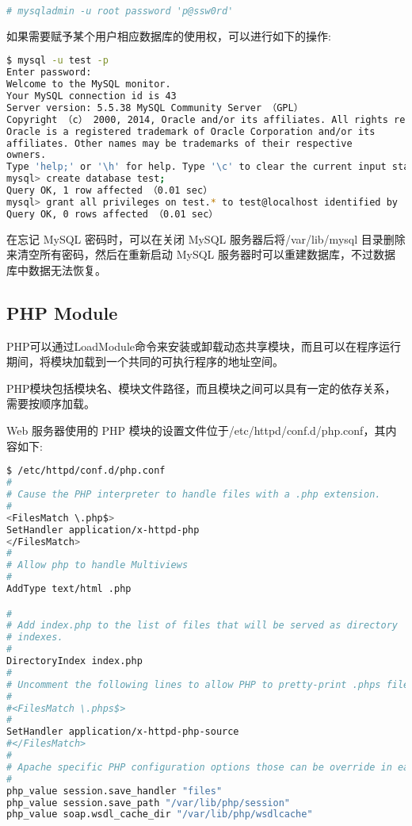 \begin{lstlisting}[language=bash]
# mysqladmin -u root password 'p@ssw0rd'
\end{lstlisting}


如果需要赋予某个用户相应数据库的使用权，可以进行如下的操作:

\begin{lstlisting}[language=bash]
$ mysql -u test -p
Enter password:
Welcome to the MySQL monitor.
Your MySQL connection id is 43
Server version: 5.5.38 MySQL Community Server （GPL）
Copyright （c） 2000, 2014, Oracle and/or its affiliates. All rights reserved.
Oracle is a registered trademark of Oracle Corporation and/or its
affiliates. Other names may be trademarks of their respective
owners.
Type 'help;' or '\h' for help. Type '\c' to clear the current input statement.
mysql> create database test;
Query OK, 1 row affected （0.01 sec）
mysql> grant all privileges on test.* to test@localhost identified by 'p@ssw0rd';
Query OK, 0 rows affected （0.01 sec）
\end{lstlisting}


在忘记 MySQL 密码时，可以在关闭 MySQL 服务器后将/var/lib/mysql 目录删除来清空所有密码，然后在重新启动 MySQL 服务器时可以重建数据库，不过数据库中数据无法恢复。

\subsection{PHP Module}

PHP可以通过LoadModule命令来安装或卸载动态共享模块，而且可以在程序运行期间，将模块加载到一个共同的可执行程序的地址空间。

PHP模块包括模块名、模块文件路径，而且模块之间可以具有一定的依存关系，需要按顺序加载。

Web 服务器使用的 PHP 模块的设置文件位于/etc/httpd/conf.d/php.conf，其内容如下:


\begin{lstlisting}[language=bash]
$ /etc/httpd/conf.d/php.conf
#
# Cause the PHP interpreter to handle files with a .php extension.
#
<FilesMatch \.php$>
SetHandler application/x-httpd-php
</FilesMatch>
#
# Allow php to handle Multiviews
#
AddType text/html .php

#
# Add index.php to the list of files that will be served as directory
# indexes.
#
DirectoryIndex index.php
#
# Uncomment the following lines to allow PHP to pretty-print .phps files as PHP source code:
#
#<FilesMatch \.phps$>
#
SetHandler application/x-httpd-php-source
#</FilesMatch>
#
# Apache specific PHP configuration options those can be override in each configured vhost
#
php_value session.save_handler "files"
php_value session.save_path "/var/lib/php/session"
php_value soap.wsdl_cache_dir "/var/lib/php/wsdlcache"
\end{lstlisting}

